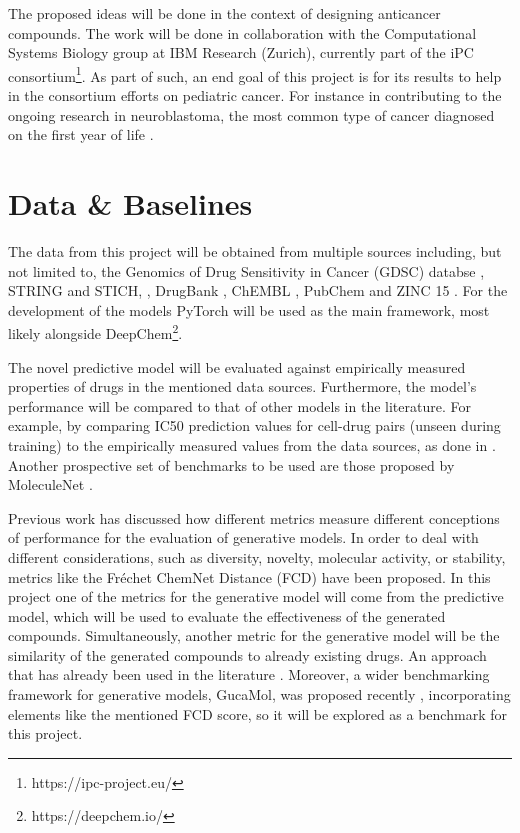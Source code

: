 \documentclass{article}
\begin{document}

{\color{red}The proposed ideas will be done in the context of designing anticancer
 compounds.} The work will be done in collaboration with the Computational Systems
 Biology group at IBM Research (Zurich), currently part of the iPC
 consortium\footnote{https://ipc-project.eu/}. As part of such, an end goal of this
 project is for its results to help in the consortium efforts on pediatric cancer. For
 instance in contributing to the ongoing research in neuroblastoma, the most common type
 of cancer diagnosed on the first year of life \cite{Maris2010}.

    \section*{Data \& Baselines}

The data from this project will be obtained from multiple sources including, but not
 limited to, the Genomics of Drug Sensitivity in Cancer (GDSC) databse \cite{Yang2013},
 STRING and STICH, \cite{Szklarczyk2019,Szklarczyk2016}, DrugBank \cite{Wishart2006},
 ChEMBL \cite{Gaulton2017}, PubChem \cite{Kim2019} and ZINC 15 \cite{Sterling2015}. For
 the development of the models PyTorch \cite{Paszke2019} will be used as the main
 framework, most likely alongside DeepChem\footnote{https://deepchem.io/}.

The novel predictive model will be evaluated against empirically measured properties of
 drugs in the mentioned data sources. Furthermore, the model's performance will be
 compared to that of other models in the literature. For example, by comparing IC50
 prediction values for cell-drug pairs (unseen during training) to the empirically
 measured values from the data sources, as done in \cite{Oskooei2019, Joo2019,
 Oskooei2018}. Another prospective set of benchmarks to be used are those proposed by
 MoleculeNet \cite{Wu2018}.

Previous work \cite{Theis2016} has discussed how different metrics measure different
 conceptions of performance for the evaluation of generative models. In order to deal
 with different considerations, such as diversity, novelty, molecular activity, or
 stability, metrics like the Fréchet ChemNet Distance (FCD) \cite{Preuer} have been
 proposed. In this project one of the metrics for the generative model will come from
 the predictive model, which will be used to evaluate the effectiveness of the generated
 compounds. Simultaneously, another metric for the generative model will be the
 similarity of the generated compounds to already existing drugs. An approach that has
 already been used in the literature \cite{Born2019}. Moreover, a wider benchmarking
 framework for generative models, GucaMol, was proposed recently \cite{Brown2019},
 incorporating elements like the mentioned FCD score, so it will be explored as a
 benchmark for this project.
 
\end{document}
